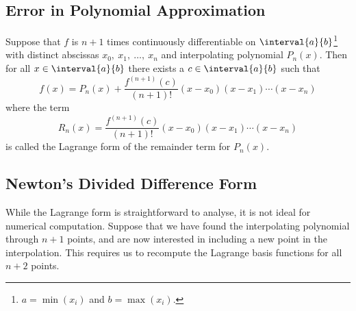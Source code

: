\documentclass{article}
\begin{document}
\subsection{Error in Polynomial Approximation}
\begin{theorem}
    Suppose that \(f\) is \(n + 1\) times continuously \linebreak
    differentiable on \(\interval{a}{b}\)\footnote{\(a = \min \left( x_i \right)\)
        and \(b = \max \left( x_i \right)\).} with distinct abscissas
    \(x_0,\: x_1,\: \dots,\: x_n\) and interpolating polynomial
    \(P_n\left( x \right)\). Then for all \(x \in \interval{a}{b}\)
    there exists a \(c \in \interval{a}{b}\) such that
    \begin{equation*}
        f\left( x \right) = P_n\left( x \right) + \frac{f^{\left( n + 1 \right)} \left( c \right)}{\left( n + 1 \right)!} \left( x - x_0 \right) \left( x - x_1 \right) \cdots \left( x - x_n \right)
    \end{equation*}
    where the term
    \begin{equation*}
        R_n\left( x \right) = \frac{f^{\left( n + 1 \right)} \left( c \right)}{\left( n + 1 \right)!} \left( x - x_0 \right) \left( x - x_1 \right) \cdots \left( x - x_n \right)
    \end{equation*}
    is called the Lagrange form of the remainder term for
    \(P_n\left( x \right)\).
\end{theorem}
\subsection{Newton's Divided Difference Form}
While the Lagrange form is straightforward to analyse, it is not ideal
for numerical computation. Suppose that we have found the interpolating
polynomial through \(n + 1\) points, and are now interested in
including a new point in the interpolation. This requires us to
recompute the Lagrange basis functions for all \(n + 2\) points.
\end{document}
